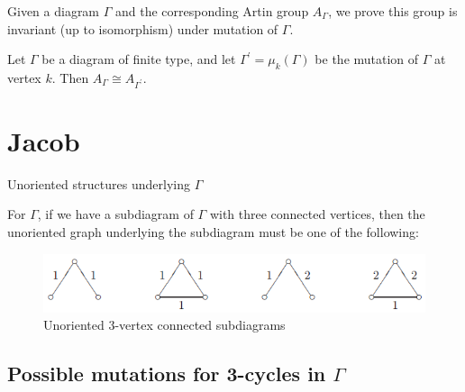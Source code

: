 \documentclass{beamer}
\begin{document}
\begin{frame}
Given a diagram $\Gamma$ and the corresponding Artin group $A_{\Gamma}$, we prove this group is invariant (up to isomorphism) under mutation of $\Gamma$.

\begin{theorem}
Let $\Gamma$ be a diagram of finite type, and let $\Gamma^{\prime} = \mu_k(\Gamma)$ be the mutation of $\Gamma$ at vertex $k$. Then $A_{\Gamma} \cong A_{\Gamma^{\prime}}$.
\end{theorem}
\end{frame}

\section{Jacob}

\begin{frame}{Unoriented structures underlying $\Gamma$}
\begin{lemma}
For $\Gamma$, if we have a subdiagram of $\Gamma$ with three connected vertices, then the unoriented graph underlying the subdiagram must be one of the following:
\begin{figure}[h]
\centering
\includegraphics[scale = .65]{3vertconnected.PNG}
\caption{Unoriented 3-vertex connected subdiagrams}
\end{figure}
\end{lemma}

\end{frame}

\subsection{Possible mutations for 3-cycles in $\Gamma$}
\end{document}
